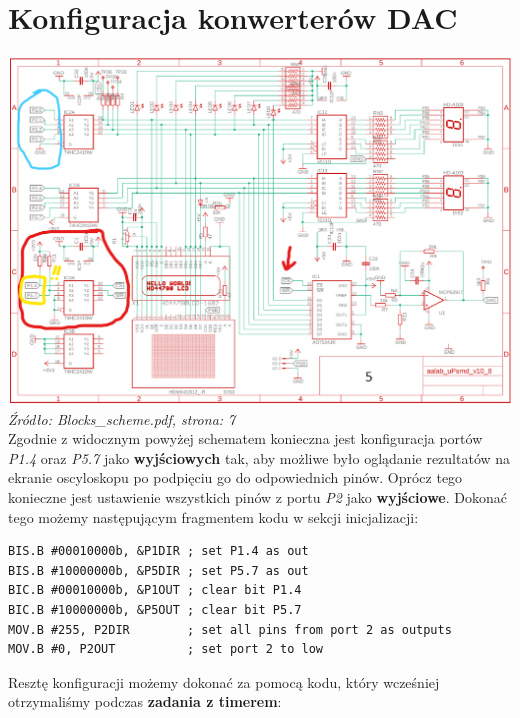 \documentclass{article}
\begin{document}
\section{Konfiguracja konwerterów DAC}
\includegraphics[width=\textwidth]{"../img/Blocks_scheme_7.png"}
\textit{Źródło: Blocks\_scheme.pdf, strona: 7}
\vspace{3mm} \\
Zgodnie z widocznym powyżej schematem konieczna jest konfiguracja portów \textit{P1.4} oraz \textit{P5.7} jako \textbf{wyjściowych} tak, aby możliwe było oglądanie rezultatów na ekranie oscyloskopu po podpięciu go do odpowiednich pinów.
Oprócz tego konieczne jest ustawienie wszystkich pinów z portu \textit{P2} jako \textbf{wyjściowe}.
Dokonać tego możemy następującym fragmentem kodu w sekcji inicjalizacji:
\begin{verbatim}
BIS.B #00010000b, &P1DIR ; set P1.4 as out
BIS.B #10000000b, &P5DIR ; set P5.7 as out
BIC.B #00010000b, &P1OUT ; clear bit P1.4
BIC.B #10000000b, &P5OUT ; clear bit P5.7
MOV.B #255, P2DIR        ; set all pins from port 2 as outputs
MOV.B #0, P2OUT          ; set port 2 to low \end{verbatim}
\newpage
Resztę konfiguracji możemy dokonać za pomocą kodu, który wcześniej otrzymaliśmy podczas \textbf{zadania z timerem}:
\end{document}
